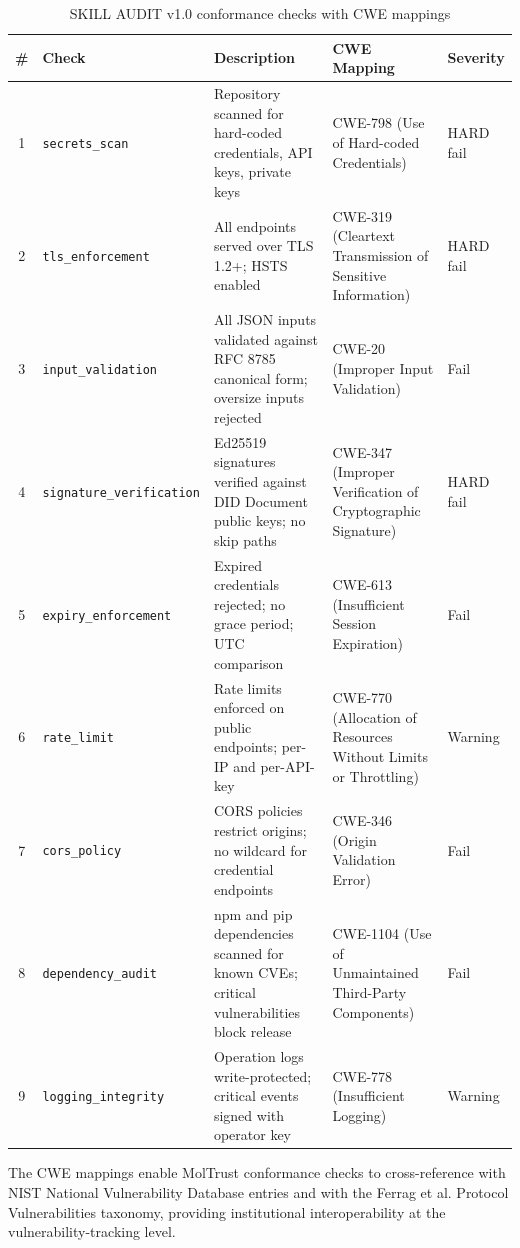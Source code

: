 \begin{table}[!htbp]
\centering
\footnotesize
\renewcommand{\arraystretch}{1.15}
\caption{SKILL AUDIT v1.0 conformance checks with CWE mappings}
\begin{tabularx}{\textwidth}{@{}c l X X l@{}}
\toprule
\# & Check & Description & CWE Mapping & Severity \\
\midrule
1 & \texttt{secrets\_scan} & Repository scanned for hard-coded credentials, API keys, private keys & CWE-798 (Use of Hard-coded Credentials) & HARD fail \\
2 & \texttt{tls\_enforcement} & All endpoints served over TLS 1.2+; HSTS enabled & CWE-319 (Cleartext Transmission of Sensitive Information) & HARD fail \\
3 & \texttt{input\_validation} & All JSON inputs validated against RFC 8785 canonical form; oversize inputs rejected & CWE-20 (Improper Input Validation) & Fail \\
4 & \texttt{signature\_verification} & Ed25519 signatures verified against DID Document public keys; no skip paths & CWE-347 (Improper Verification of Cryptographic Signature) & HARD fail \\
5 & \texttt{expiry\_enforcement} & Expired credentials rejected; no grace period; UTC comparison & CWE-613 (Insufficient Session Expiration) & Fail \\
6 & \texttt{rate\_limit} & Rate limits enforced on public endpoints; per-IP and per-API-key & CWE-770 (Allocation of Resources Without Limits or Throttling) & Warning \\
7 & \texttt{cors\_policy} & CORS policies restrict origins; no wildcard for credential endpoints & CWE-346 (Origin Validation Error) & Fail \\
8 & \texttt{dependency\_audit} & npm and pip dependencies scanned for known CVEs; critical vulnerabilities block release & CWE-1104 (Use of Unmaintained Third-Party Components) & Fail \\
9 & \texttt{logging\_integrity} & Operation logs write-protected; critical events signed with operator key & CWE-778 (Insufficient Logging) & Warning \\
\bottomrule
\end{tabularx}
\end{table}

The CWE mappings enable MolTrust conformance checks to cross-reference with NIST National Vulnerability Database entries and with the Ferrag et al. \cite{ref18_ferrag} Protocol Vulnerabilities taxonomy, providing institutional interoperability at the vulnerability-tracking level.


